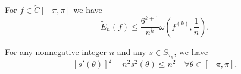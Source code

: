 \begin{theorem}\label{thm:jacksons_trigonometric_theorem}\mcite\cite[47]{Николов2020}
  For \( f \in \tilde{C}[-\pi, \pi] \) we have
  \begin{equation*}
    \tilde{E}_n(f) \leq \frac {6^{k+1}} {n^k} \omega\left(f^{(k)}, \frac 1 n \right).
  \end{equation*}
\end{theorem}

\begin{theorem}\label{thm:szegos_trigonometric_inequality}\mcite\cite[55]{Николов2020}
  For any nonnegative integer \( n \) and any \( s \in S_{\tau_n} \), we have
  \begin{equation}\label{eq:thm:szegos_trigonometric_inequality}
    [s'(\theta)]^2 + n^2 s^2 (\theta) \leq n^2 \quad\forall \theta \in [-\pi, \pi].
  \end{equation}
\end{theorem}
